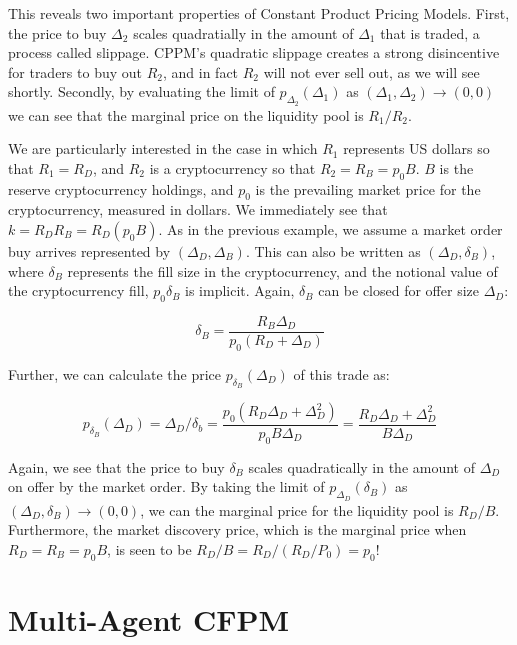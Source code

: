 \documentclass{article}
\begin{document}
This reveals two important properties of Constant Product Pricing Models. First, the price to buy $\Delta_2$ scales quadratially in the amount of $\Delta_1$ that is traded, a process called slippage. CPPM's quadratic slippage creates a strong disincentive for traders to buy out $R_2$, and in fact $R_2$ will not ever sell out, as we will see shortly. Secondly, by evaluating the limit of $p_{\Delta_2}(\Delta_1)$ as $(\Delta_1, \Delta_2) \rightarrow (0, 0)$ we can see that the marginal price on the liquidity pool is $R_1 / R_2$.

We are particularly interested in the case in which $R_1$ represents US dollars so that $R_1 = R_D$, and $R_2$ is a cryptocurrency so that $R_2 = R_B = p_{0} B$. $B$ is the reserve cryptocurrency holdings, and $p_{0}$ is the prevailing market price for the cryptocurrency, measured in dollars. We immediately see that $k = R_D R_B = R_D (p_0 B)$. As in the previous example, we assume a market order buy arrives represented by $(\Delta_D, \Delta_B)$. This can also be written as $(\Delta_D, \delta_B)$, where $\delta_B$ represents the fill size in the cryptocurrency, and the notional value of the cryptocurrency fill, $p_0 \delta_B$ is implicit. Again, $\delta_B$ can be closed for offer size $\Delta_D$:

\begin{equation}
\label{eq:cppm_sol}
\delta_B = \frac{R_B \Delta_D}{p_0 ( R_D + \Delta_D )}
\end{equation}

Further, we can calculate the price $p_{\delta_B}(\Delta_D)$ of this trade as:

\begin{equation}
\label{eq:cppm_sol}
p_{\delta_B}(\Delta_D) = \Delta_D / \delta_b = \frac{p_0 (R_D \Delta_D + \Delta_D^2)}{p_0 B \Delta_D} = \frac{R_D \Delta_D + \Delta_D^2}{B \Delta_D}
\end{equation}

Again, we see that the price to buy $\delta_B$ scales quadratically in the amount of $\Delta_D$ on offer by the market order. By taking the limit of $p_{\Delta_D}(\delta_B)$ as $(\Delta_D, \delta_B) \rightarrow (0, 0)$, we can the marginal price for the liquidity pool is $R_D / B$. Furthermore, the market discovery price, which is the marginal price when $R_D = R_B = p_0 B$, is seen to be $R_D / B = R_D / (R_D / P_0) = p_0$!

\section{Multi-Agent CFPM}
\label{sec:multiagent}
\end{document}
